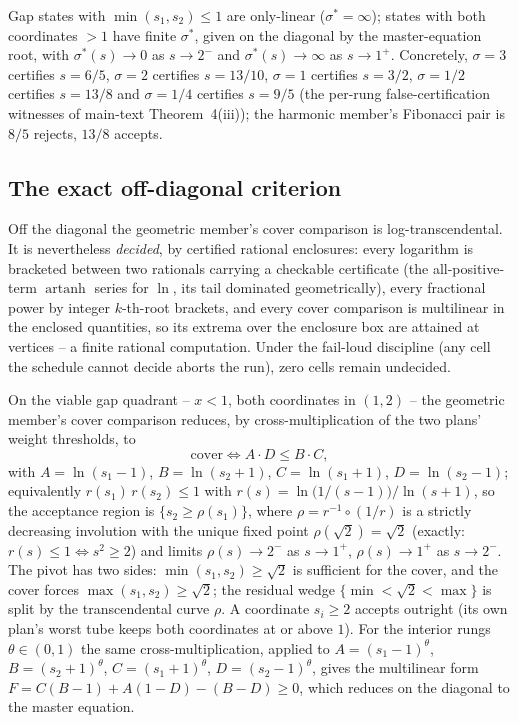 Gap states with $\min(s_1,s_2)\le1$ are only-linear ($\sigma^*=\infty$); states with both coordinates $>1$ have finite $\sigma^*$, given on the diagonal by the master-equation root, with $\sigma^*(s)\to0$ as $s\to2^-$ and $\sigma^*(s)\to\infty$ as $s\to1^+$. Concretely, $\sigma=3$ certifies $s=6/5$, $\sigma=2$ certifies $s=13/10$, $\sigma=1$ certifies $s=3/2$, $\sigma=1/2$ certifies $s=13/8$ and $\sigma=1/4$ certifies $s=9/5$ (the per-rung false-certification witnesses of main-text Theorem~4(iii)); the harmonic member's Fibonacci pair is $8/5$ rejects, $13/8$ accepts.

\subsection{The exact off-diagonal criterion}

Off the diagonal the geometric member's cover comparison is log-transcendental. It is nevertheless \emph{decided}, by certified rational enclosures: every logarithm is bracketed between two rationals carrying a checkable certificate (the all-positive-term $\operatorname{artanh}$ series for $\ln$, its tail dominated geometrically), every fractional power by integer $k$-th-root brackets, and every cover comparison is multilinear in the enclosed quantities, so its extrema over the enclosure box are attained at vertices -- a finite rational computation. Under the fail-loud discipline (any cell the schedule cannot decide aborts the run), zero cells remain undecided.

\begin{theorem}\label{thm:offdiag}
On the viable gap quadrant -- $x<1$, both coordinates in $(1,2)$ -- the geometric member's cover comparison reduces, by cross-multiplication of the two plans' weight thresholds, to
\[
\mathrm{cover}\iff A\cdot D\le B\cdot C,
\]
with $A=\ln(s_1-1)$, $B=\ln(s_2+1)$, $C=\ln(s_1+1)$, $D=\ln(s_2-1)$;
equivalently $r(s_1)\,r(s_2)\le1$ with $r(s)=\ln\!\big(1/(s-1)\big)/\ln(s+1)$, so the acceptance region is $\{s_2\ge\rho(s_1)\}$, where $\rho=r^{-1}\circ(1/r)$ is a strictly decreasing involution with the unique fixed point $\rho(\sqrt2)=\sqrt2$ (exactly: $r(s)\le1\iff s^2\ge2$) and limits $\rho(s)\to2^-$ as $s\to1^+$, $\rho(s)\to1^+$ as $s\to2^-$. The pivot has two sides: $\min(s_1,s_2)\ge\sqrt2$ is sufficient for the cover, and the cover forces $\max(s_1,s_2)\ge\sqrt2$; the residual wedge $\{\min<\sqrt2<\max\}$ is split by the transcendental curve $\rho$. A coordinate $s_i\ge2$ accepts outright (its own plan's worst tube keeps both coordinates at or above $1$). For the interior rungs $\theta\in(0,1)$ the same cross-multiplication, applied to $A=(s_1-1)^\theta$, $B=(s_2+1)^\theta$, $C=(s_1+1)^\theta$, $D=(s_2-1)^\theta$, gives the multilinear form $F=C(B-1)+A(1-D)-(B-D)\ge0$, which reduces on the diagonal to the master equation.
\end{theorem}

